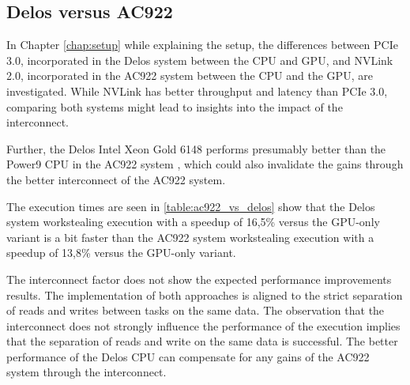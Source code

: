 \subsection{Delos versus AC922}
In Chapter \ref{chap:setup} while explaining the setup, the differences between PCIe 3.0, incorporated in the Delos system between the CPU and GPU, and NVLink 2.0, incorporated in the AC922 system between the CPU and the GPU, are investigated. While NVLink has better throughput and latency than PCIe 3.0, comparing both systems might lead to insights into the impact of the interconnect.

Further, the Delos Intel Xeon Gold 6148 performs presumably better than the Power9 CPU in the AC922 system \cite{POWER9BenchmarksVs}, which could also invalidate the gains through the better interconnect of the AC922 system.



The execution times are seen in \ref{table:ac922_vs_delos} show that the Delos system workstealing execution with a speedup of 16,5\% versus the GPU-only variant is a bit faster than the AC922 system workstealing execution with a speedup of 13,8\% versus the GPU-only variant.

The interconnect factor does not show the expected performance improvements results. The implementation of both approaches is aligned to the strict separation of reads and writes between tasks on the same data. The observation that the interconnect does not strongly influence the performance of the execution implies that the separation of reads and write on the same data is successful. The better performance of the Delos CPU can compensate for any gains of the AC922 system through the interconnect.




